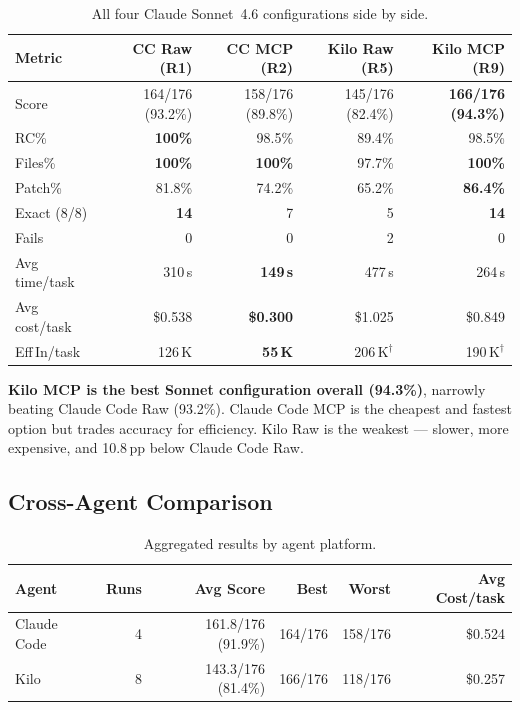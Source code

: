 \begin{table}[h]
\centering
\small
\caption{All four Claude Sonnet~4.6 configurations side by side.}\label{tab:sonnet-four}
\setlength{\tabcolsep}{5pt}
\begin{tabular}{lrrrr}
\toprule
\textbf{Metric}
  & \textbf{CC Raw (R1)}
  & \textbf{CC MCP (R2)}
  & \textbf{Kilo Raw (R5)}
  & \textbf{Kilo MCP (R9)} \\
\midrule
Score           & 164/176 (93.2\%) & 158/176 (89.8\%) & 145/176 (82.4\%) & \textbf{166/176 (94.3\%)} \\
RC\%            & \textbf{100\%}   & 98.5\%           & 89.4\%           & 98.5\% \\
Files\%         & \textbf{100\%}   & \textbf{100\%}   & 97.7\%           & \textbf{100\%} \\
Patch\%         & 81.8\%           & 74.2\%           & 65.2\%           & \textbf{86.4\%} \\
Exact (8/8)     & \textbf{14}      & 7                & 5                & \textbf{14} \\
Fails           & 0                & 0                & 2                & 0 \\
Avg time/task   & 310\,s           & \textbf{149\,s}  & 477\,s           & 264\,s \\
Avg cost/task   & \$0.538          & \textbf{\$0.300} & \$1.025          & \$0.849 \\
Eff\,In/task    & 126\,K           & \textbf{55\,K}   & 206\,K$^\dagger$ & 190\,K$^\dagger$ \\
\bottomrule
\end{tabular}
\end{table}

\noindent
\textbf{Kilo MCP is the best Sonnet configuration overall (94.3\%)},
narrowly beating Claude Code Raw (93.2\%).
Claude Code MCP is the cheapest and fastest option but trades accuracy for
efficiency.
Kilo Raw is the weakest --- slower, more expensive, and 10.8\,pp below
Claude Code Raw.

\subsection{Cross-Agent Comparison}

\begin{table}[h]
\centering
\caption{Aggregated results by agent platform.}\label{tab:cross-agent}
\begin{tabular}{lrrrrr}
\toprule
\textbf{Agent} & \textbf{Runs} & \textbf{Avg Score} & \textbf{Best} & \textbf{Worst} & \textbf{Avg Cost/task} \\
\midrule
Claude Code & 4 & 161.8/176 (91.9\%) & 164/176 & 158/176 & \$0.524 \\
Kilo        & 8 & 143.3/176 (81.4\%) & 166/176 & 118/176 & \$0.257 \\
\bottomrule
\end{tabular}
\end{table}


